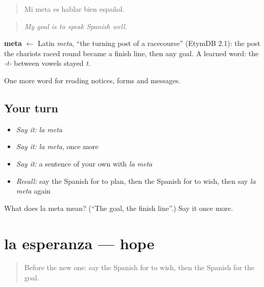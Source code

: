 \begin{quote}
Mi meta es hablar bien español.
\end{quote}

\begin{quote}
\emph{My goal is to speak Spanish well.}
\end{quote}

\begin{cousinweb}
\textbf{meta} $\leftarrow$ Latin \emph{meta}, \textquotedblleft{}the turning post of a racecourse\textquotedblright{} (EtymDB 2.1): the post the chariots raced round became a finish line, then any goal. A learned word: the \emph{-t-} between vowels stayed \emph{t}.
\end{cousinweb}

\begin{grammarlens}[title={What you've built}]
One more word for reading notices, forms and messages.
\end{grammarlens}

\subsection*{Your turn}
\begin{itemize}
\raggedright
  \item \emph{Say it:} \emph{la meta}
  \item \emph{Say it:} \emph{la meta}, once more
  \item \emph{Say it:} a sentence of your own with \emph{la meta}
  \item \emph{Recall:} say the Spanish for to plan, then the Spanish for to wish, then say \emph{la meta} again
\end{itemize}

\begin{tcolorbox}[breakable,colback=teal!4,colframe=teal!35!black,title={Before you move on}]
What does la meta mean? (\textquotedblleft{}The goal, the finish line\textquotedblright{}.) Say it once more.
\end{tcolorbox}
\section[la esperanza]{la esperanza — hope}

\label{lesson:ES-C509-esperanza}



\begin{quote}
Before the new one: say the Spanish for to wish, then the Spanish for the goal.
\end{quote}

